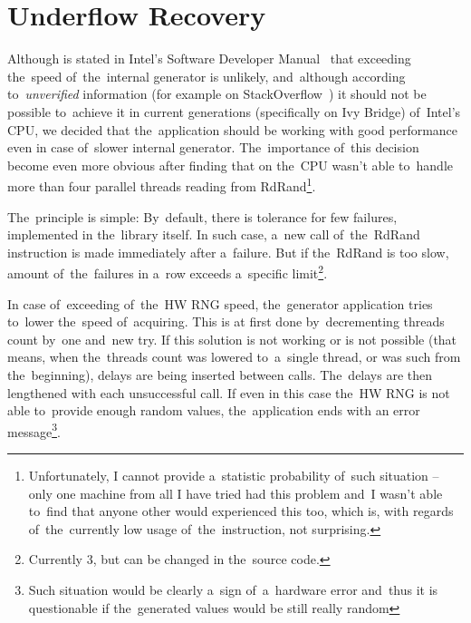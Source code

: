 \section{Underflow Recovery}
\par{
Although is stated in Intel's Software Developer Manual~\cite[chapter~7.3.17]{IntelSWManualVol1} that exceeding the~speed of~the~internal generator is unlikely, and~although according to~{\em unverified} information (for example on StackOverflow~\cite{StackoverflowRDRANDCharacteristics}) it should not be possible to~achieve it in current generations (specifically on Ivy Bridge) of~Intel's CPU, we decided that the~application should be working with good performance even in case of~slower internal generator. The~importance of~this decision become even more obvious after finding that on  the~CPU wasn't able to~handle more than four parallel threads reading from RdRand\footnote{Unfortunately, I cannot provide a~statistic probability of~such situation -- only one machine from all I have tried had this problem and~I wasn't able to~find that anyone other would experienced this too, which is, with regards of~the~currently low usage of~the~instruction, not surprising.}.
}

\par{
The~principle is simple: By~default, there is tolerance for few failures, implemented in the~library itself. In such case, a~new call of~the~RdRand instruction is made immediately after a~failure. But if the~RdRand is too slow, amount of~the~failures in a~row exceeds a~specific limit\footnote{Currently 3, but can be changed in the~source code.}. 
}

\par{
In case of~exceeding of~the~HW RNG speed, the~generator application tries to~lower the~speed of~acquiring. This is at first done by~decrementing threads count by~one and~new try. If this solution is not working or is not possible (that means, when the~threads count was lowered to~a~single thread, or was such from the~beginning), delays are being inserted between calls. The~delays are then lengthened with each unsuccessful call. If even in this case the~HW RNG is not able to~provide enough random values, the~application ends with an error message\footnote{Such situation would be clearly a~sign of~a~hardware error and~thus it is questionable if the~generated values would be still really random}.
}
